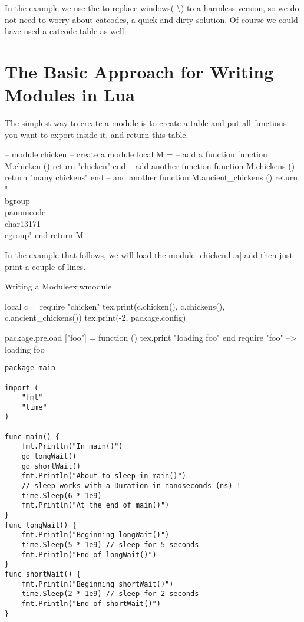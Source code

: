 In the example we use the  to replace windows( \textbackslash) to a harmless version, so we do not need to worry about catcodes, a quick and dirty solution.  Of course we could have used a catcode table as well.

\section{The Basic Approach for Writing Modules in Lua}

The simplest way to create a module is to create a table and put all functions you want to export inside it, and return this table.

\begin{lualisting}
-- module chicken
-- create a module
local M = {}
-- add a function
function M.chicken ()
  return "chicken"
end
-- add another function
function M.chickens ()
  return "many chickens" 
end
-- and another
function M.ancient_chickens ()
  return "\\bgroup\\panunicode\\char\"13171 \\egroup"
end
return M
\end{lualisting}

In the example that follows, we will load the module |chicken.lua| and then just print a couple of lines.
\begin{luaexample}{Writing a Module}{ex:wmodule}
\begin{luacode*}
local c = require "chicken"
      tex.print(c.chicken(), c.chickens(), c.ancient_chickens())
      tex.print(-2, package.config)
      
      package.preload ["foo"] = function () tex.print "loading foo" end
require "foo"  --> loading foo
\end{luacode*}
\end{luaexample}


\begin{lstlisting}
package main

import (
	"fmt"
	"time"
)

func main() {
	fmt.Println("In main()")
	go longWait()
	go shortWait()
	fmt.Println("About to sleep in main()")
	// sleep works with a Duration in nanoseconds (ns) !
	time.Sleep(6 * 1e9)
	fmt.Println("At the end of main()")
}
func longWait() {
	fmt.Println("Beginning longWait()")
	time.Sleep(5 * 1e9) // sleep for 5 seconds
	fmt.Println("End of longWait()")
}
func shortWait() {
	fmt.Println("Beginning shortWait()")
	time.Sleep(2 * 1e9) // sleep for 2 seconds
	fmt.Println("End of shortWait()")
}

\end{lstlisting}



